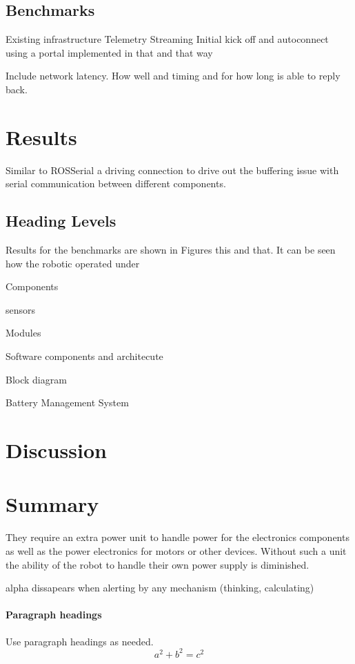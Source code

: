 \subsection{Benchmarks}

Existing infrastructure
Telemetry
Streaming
Initial kick off and autoconnect using a portal implemented in that and that way

Include network latency.  How well and timing and for how long is able to reply back.

\section{Results}
\label{sec:results}

Similar to ROSSerial a driving connection to drive out the buffering issue with serial communication between different components.

\subsection{Heading Levels}

Results for the benchmarks are shown in Figures this and that.  It can be seen how the robotic operated under 


Components 

sensors

Modules

Software components and architecute

Block diagram

Battery Management System 
\section{Discussion}

\section{Summary}

They require an extra power unit to handle power for the electronics components as well as the power electronics for motors or other devices.  Without such a unit the ability of the robot to handle their own power supply is diminished.


alpha dissapears when alerting by any mechanism (thinking, calculating)

\paragraph{Paragraph headings} Use paragraph headings as needed.
\begin{equation}
a^2+b^2=c^2
\end{equation}

